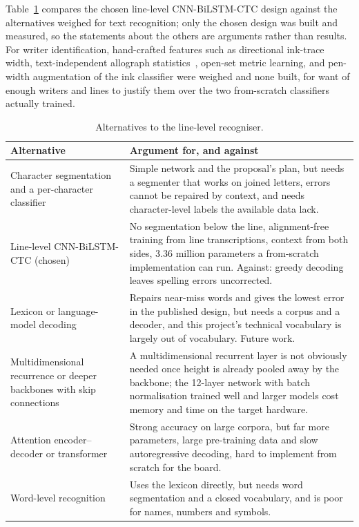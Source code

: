 Table~\ref{tab:rec-alt} compares the chosen line-level CNN-BiLSTM-CTC design against the alternatives weighed for text recognition; only the chosen design was built and measured, so the statements about the others are arguments rather than results. For writer identification, hand-crafted features such as directional ink-trace width, text-independent allograph statistics~\cite{bulacu2007}, open-set metric learning, and pen-width augmentation of the ink classifier were weighed and none built, for want of enough writers and lines to justify them over the two from-scratch classifiers actually trained.

\begin{table}[h]
\centering
\fontsize{8.5}{10.2}\selectfont
\setlength{\tabcolsep}{4pt}
\begin{tabularx}{\linewidth}{|p{3.1cm}|X|}
\hline
\textbf{Alternative} & \textbf{Argument for, and against} \\
\hline
Character segmentation and a per-character classifier & Simple network and the proposal's plan, but needs a segmenter that works on joined letters, errors cannot be repaired by context, and needs character-level labels the available data lack. \\
\hline
Line-level CNN-BiLSTM-CTC (chosen)~\cite[p.~2298]{shi2017} & No segmentation below the line, alignment-free training from line transcriptions, context from both sides, 3.36 million parameters a from-scratch implementation can run. Against: greedy decoding leaves spelling errors uncorrected. \\
\hline
Lexicon or language-model decoding & Repairs near-miss words and gives the lowest error in the published design, but needs a corpus and a decoder, and this project's technical vocabulary is largely out of vocabulary. Future work. \\
\hline
Multidimensional recurrence or deeper backbones with skip connections & A multidimensional recurrent layer is not obviously needed once height is already pooled away by the backbone; the 12-layer network with batch normalisation trained well and larger models cost memory and time on the target hardware. \\
\hline
Attention encoder--decoder or transformer & Strong accuracy on large corpora, but far more parameters, large pre-training data and slow autoregressive decoding, hard to implement from scratch for the board. \\
\hline
Word-level recognition & Uses the lexicon directly, but needs word segmentation and a closed vocabulary, and is poor for names, numbers and symbols. \\
\hline
\end{tabularx}
\caption{Alternatives to the line-level recogniser.}
\label{tab:rec-alt}
\end{table}

